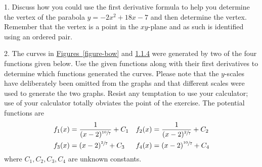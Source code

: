 \documentclass[12pt,]{book}
\theoremstyle{plain}
\theoremstyle{definition}
\numberwithin{equation}{section}
\newcounter{figstack}
\newcounter{figindex}
\newlength\fight
\newcommand\pushValignCaptionBottom[5][b]{%
\stepcounter{figstack}%
\expandafter\def\csname %
figalign\romannumeral\value{figstack}\endcsname{#1}%
\expandafter\def\csname %
figtype\romannumeral\value{figstack}\endcsname{#2}%
\expandafter\def\csname %
figwd\romannumeral\value{figstack}\endcsname{#3}%
\expandafter\def\csname %
figcontent\romannumeral\value{figstack}\endcsname{#4}%
\expandafter\def\csname %
figcap\romannumeral\value{figstack}\endcsname{#5}%
\setbox0=\hbox{%
\begin{#2}{#3}#4\end{#2}}%
\ifdim\dimexpr\ht0+\dp0\relax>\fight\global\setlength{\fight}{%
\dimexpr\ht0+\dp0\relax}\fi%
}
\newcommand\popValignCaptionBottom{%
\setcounter{figindex}{0}%
\hfill%
\whiledo{\value{figindex}<\value{figstack}}{%
\stepcounter{figindex}%
\def\tmp{\csname figwd\romannumeral\value{figindex}\endcsname}%
\begin{\csname figtype\romannumeral\value{figindex}\endcsname}[t]{\tmp}%
\centering%
\stackinset{c}{}%
{\csname figalign\romannumeral\value{figindex}\endcsname}{}%
{\csname figcontent\romannumeral\value{figindex}\endcsname}%
{\rule{0pt}{\fight}}\par%
\csname figcap\romannumeral\value{figindex}\endcsname%
\end{\csname figtype\romannumeral\value{figindex}\endcsname}%
\hfill%
}%
\setcounter{figstack}{0}%
\setlength{\fight}{0pt}%
\hfill%
}
\providecommand\phantomsection{}
\newcommand{\fe}[2]{\mathop{{#1}{\left(#2\right)}}}
\begin{document}
\begin{exerciselist}
\item[1.]\phantomsection\hypertarget{exercise-parabola-vertex}{\null}Discuss how you could use the first derivative formula to help you determine the vertex of the parabola \(y=-2x^2+18x-7\) and then determine the vertex.  Remember that the vertex is a point in the \(xy\)-plane and as such is identified using an ordered pair.%
\par\smallskip
\item[2.]\phantomsection\hypertarget{exercise-distinguish-graphs-by-critical-nature}{\null}The curves in \hyperref[figure-bow]{Figures~\ref*{figure-bow}} and \hyperref[figure-pointy]{1.1.4} were generated by two of the four functions given below.  Use the given functions along with their first derivatives to determine which functions generated the curves.  Please note that the \(y\)-scales have deliberately been omitted from the graphs and that different scales were used to generate the two graphs.  Resist any temptation to use your calculator; use of your calculator totally obviates the point of the exercise. The potential functions are \begin{align*}
\fe{f_1}{x}&=\frac{1}{(x-2)^{\sfrac{10}{7}}}+C_1&\fe{f_2}{x}&=\frac{1}{(x-2)^{\sfrac{2}{7}}}+C_2\\
\fe{f_3}{x}&=(x-2)^{\sfrac{2}{7}}+C_3&\fe{f_4}{x}&=(x-2)^{\sfrac{10}{7}}+C_4
\end{align*} where \(C_1,C_2,C_3,C_4\) are unknown constants.%
\par\smallskip
\end{exerciselist}
\typeout{************************************************}
\typeout{************************************************}
\end{document}
